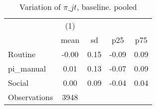 \begin{table}[htbp]\centering
\def\sym#1{\ifmmode^{#1}\else\(^{#1}\)\fi}
\caption{Variation of $\pi\_{jt}$, baseline. pooled}
\begin{tabular}{l*{1}{cccc}}
\toprule
                    &\multicolumn{1}{c}{(1)}&            &            &            \\
                    &        mean&          sd&         p25&         p75\\
\midrule
Routine             &       -0.00&        0.15&       -0.09&        0.09\\
pi\_manual           &        0.01&        0.13&       -0.07&        0.09\\
Social              &        0.00&        0.09&       -0.04&        0.04\\
\midrule
Observations        &        3948&            &            &            \\
\bottomrule
\end{tabular}
\end{table}

